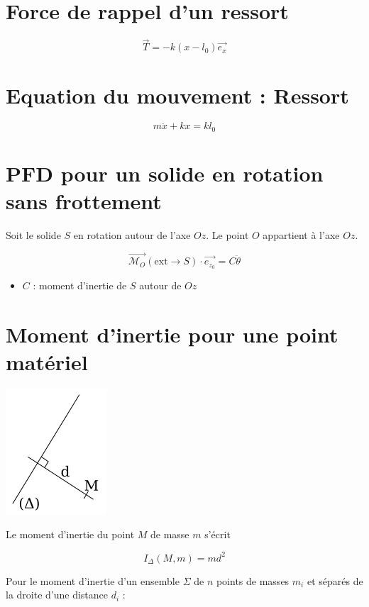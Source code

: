 \documentclass[a4paper, 11pt]{article}
\newcommand{\vect}{\overrightarrow}
\begin{document}
\section{Force de rappel d'un ressort}

\[
    \vect{T} = -k\left(x-l_0\right)\vect{e_x}
\]

\section{Equation du mouvement : Ressort}

\[
    m\ddot{x} + kx = kl_0
\]

\section{PFD pour un solide en rotation sans frottement}

Soit le solide $S$ en rotation autour de l'axe $Oz$. Le point $O$ appartient à l'axe $Oz$.

\[
    \vect{\mathcal{M}_O}(\mathrm{ext} \rightarrow S)\cdot\vect{e_{z_0}} = C\ddot{\theta}
\]

\begin{itemize}
    \item $C$ : moment d'inertie de $S$ autour de $Oz$
\end{itemize}

\section{Moment d'inertie pour une point matériel}

\vfill
\begin{center}\includegraphics[scale=0.7]{i_delta1.png}\end{center}
\vfill

Le moment d'inertie du point $M$ de masse $m$ s'écrit

\[
    I_\Delta(M,m) = md^2
\]

Pour le moment d'inertie d'un ensemble $\Sigma$ de $n$ points de masses $m_i$ et séparés de la droite d'une distance
$d_i$ :
\end{document}
